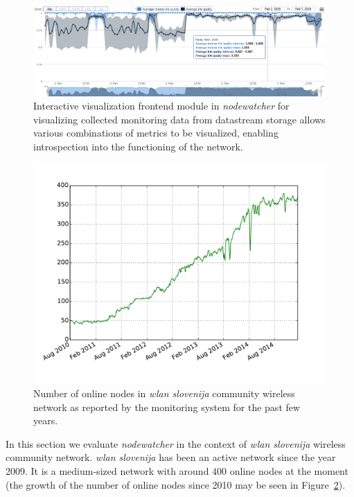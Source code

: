 \documentclass[5p,sort&compress]{elsarticle}
\newcommand{\nodewatcher}{\textit{nodewatcher}}
\newcommand{\wlanslovenija}{\textit{wlan slovenija}}
\begin{document}
\begin{figure}
  \centering
  \includegraphics[scale=0.45]{figures/implementation-interactive-visualization.png}
  \caption{Interactive visualization frontend module in \nodewatcher{} for visualizing collected monitoring data from datastream storage allows various combinations of metrics to be visualized, enabling introspection into the functioning of the network.}
  \label{fig:interactive-visualization}
\end{figure}

\begin{figure}
  \centering
  \includegraphics[scale=0.45]{figures/wlansi-nodes-up.pdf}
  \caption{Number of online nodes in \wlanslovenija{} community wireless network as reported by the monitoring system for the past few years.}
  \label{fig:wlansi-nodes-up}
\end{figure}

In this section we evaluate \nodewatcher{} in the context of \wlanslovenija{} wireless community network.
\wlanslovenija{} has been an active network since the year 2009.
It is a medium-sized network with around $400$ online nodes at the moment (the growth of the number of online nodes since 2010 may be seen in Figure~\ref{fig:wlansi-nodes-up}).
\end{document}
